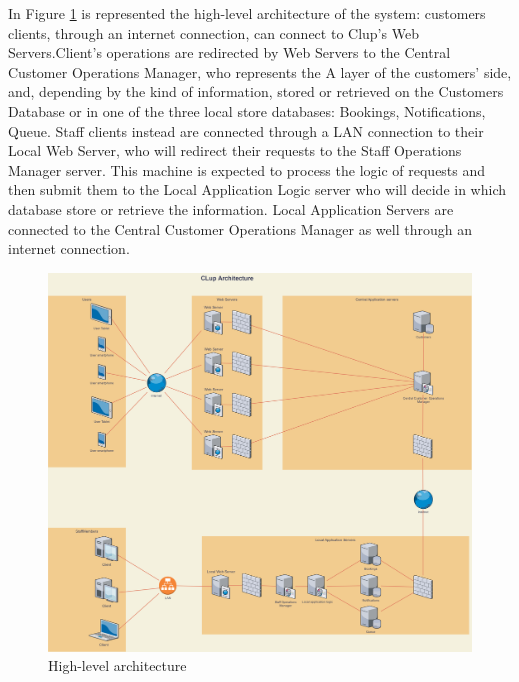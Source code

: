 In Figure \ref{fig:HLArch} is represented the high-level architecture of the system: customers clients, through an internet connection, can connect to Clup's Web Servers.Client's operations are redirected by Web Servers to the Central Customer Operations Manager, who represents the A layer of the customers' side, and, depending by the kind of information, stored or retrieved on the Customers Database or in one of the three local store databases: Bookings, Notifications, Queue. Staff clients instead are connected through a LAN connection to their Local Web Server, who will redirect their requests to the Staff Operations Manager server. This machine is expected to process the logic of requests and then submit them to the Local Application Logic server who will decide in which database store or retrieve the information. Local Application Servers are connected to the Central Customer Operations Manager as well through an internet connection.
\begin{figure}[h!]
	\includegraphics[width=\linewidth]{../Diagrams/Archtecture/Architecture_diagram.png}
	\caption{High-level architecture}
	\label{fig:HLArch}
\end{figure}

